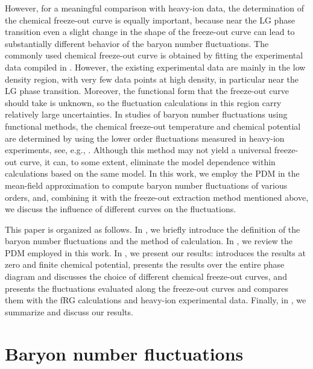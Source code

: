 \documentclass[aps,twocolumn,prd,superscriptaddress,nofootinbib,floatfix]{revtex4-2}
\newcommand{\colsy}[1]{\textcolor{green}{#1}}
\begin{document}
However, for a meaningful comparison with heavy-ion data, the determination of the chemical freeze-out curve is equally important, because near the LG phase transition even a slight change in the shape of the freeze-out curve can lead to substantially different behavior of the baryon number fluctuations. The commonly used chemical freeze-out curve is obtained by fitting the experimental data compiled in \cite{Andronic:2017pug}. However, the existing experimental data are mainly in the low density region, with very few data points at high density, in particular near the LG phase transition. Moreover, the functional form that the freeze-out curve should take is unknown, so the fluctuation calculations in this region carry relatively large uncertainties. In studies of baryon number fluctuations using functional methods, the chemical freeze-out temperature and chemical potential are determined by using the lower order fluctuations measured in heavy-ion experiments, see, e.g., \cite{Fu:2015amv,Lu:2026ezr}. Although this method may not yield a universal freeze-out curve, it can, to some extent, eliminate the model dependence within calculations based on the same model. In this work, we employ the PDM in the mean-field approximation to compute baryon number fluctuations of various orders, and, combining it with the freeze-out extraction method mentioned above, we discuss the influence of different curves on the fluctuations. 

This paper is organized as follows. In , we briefly introduce the definition of the baryon number fluctuations and the method of calculation. In , we review the PDM employed in this work. In , we present our results:  introduces the results at zero and finite chemical potential,  presents the results over the entire phase diagram and discusses the choice of different chemical freeze-out curves, and  presents the fluctuations evaluated along the freeze-out curves and compares them with the fRG calculations and heavy-ion experimental data. Finally, in , we summarize and discuss our results.

\section{Baryon number fluctuations}
\label{sec:fluc} 
\end{document}
